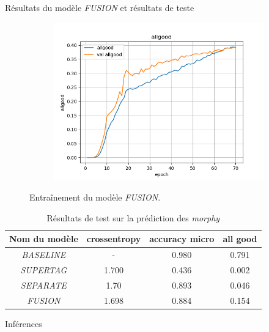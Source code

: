 \documentclass[11pt]{beamer}
\begin{document}
\begin{frame}{Résultats du modèle \textit{FUSION} et résultats de teste}
\begin{figure}
\begin{subfigure}{0.32\textwidth}
            \centering
            \includegraphics[width=\linewidth]{../logs/fusion/allgood.png}
        \end{subfigure}
        \caption{Entraînement du modèle \textit{FUSION}.}
        \label{fig: results fusion}
    \end{figure}

    \begin{table}
        \centering
        \begin{tabular}{|c|c|c|c|}
            \hline
             Nom du modèle & crossentropy & accuracy micro & all good\\
             \hline
             \textit{BASELINE}& - & 0.980 & 0.791 \\
             \hline
             \textit{SUPERTAG}& 1.700 & 0.436 & 0.002\\
             \hline
             \textit{SEPARATE}& 1.70 & 0.893 & 0.046\\
             \hline
             \textit{FUSION}& 1.698 & 0.884 & 0.154 \\
             \hline
        \end{tabular}
        \caption{Résultats de test sur la prédiction des \textit{morphy}}
        \label{tab: test morphy}
    \end{table}
\end{frame}

\begin{frame}{Inférences}
    
\end{frame}
\end{document}
